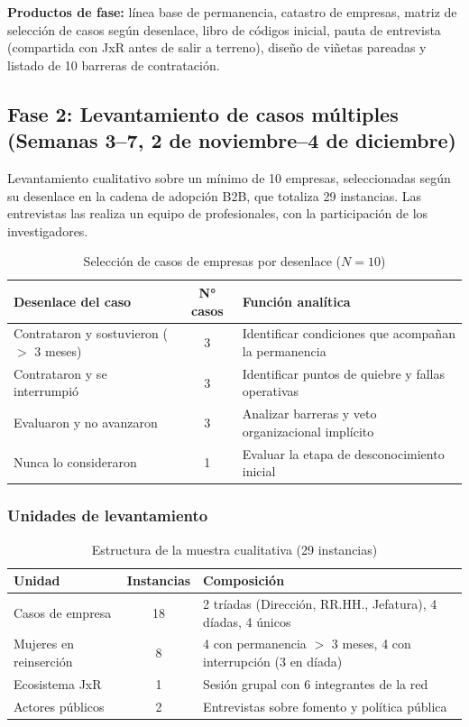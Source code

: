 \textbf{Productos de fase:} línea base de permanencia, catastro de empresas, matriz de selección de casos según desenlace, libro de códigos inicial, pauta de entrevista (compartida con JxR antes de salir a terreno), diseño de viñetas pareadas y listado de 10 barreras de contratación.

\subsection{Fase 2: Levantamiento de casos múltiples (Semanas 3--7, 2 de noviembre--4 de diciembre)}

Levantamiento cualitativo sobre un mínimo de 10 empresas, seleccionadas según su desenlace en la cadena de adopción B2B, que totaliza 29 instancias. Las entrevistas las realiza un equipo de profesionales, con la participación de los investigadores.

\begin{table}[ht]
\centering
\caption{Selección de casos de empresas por desenlace ($N = 10$)}
\label{tab:casos}
\begin{tabular}{p{5.5cm}cp{6.5cm}}
\hline
\textbf{Desenlace del caso} & \textbf{N° casos} & \textbf{Función analítica} \\
\hline
Contrataron y sostuvieron ($>$ 3 meses) & 3 & Identificar condiciones que acompañan la permanencia \\
Contrataron y se interrumpió & 3 & Identificar puntos de quiebre y fallas operativas \\
Evaluaron y no avanzaron & 3 & Analizar barreras y veto organizacional implícito \\
Nunca lo consideraron & 1 & Evaluar la etapa de desconocimiento inicial \\
\hline
\end{tabular}
\end{table}

\subsubsection{Unidades de levantamiento}

\begin{table}[ht]
\centering
\caption{Estructura de la muestra cualitativa (29 instancias)}
\label{tab:muestra}
\begin{tabular}{p{3.8cm}cp{7.5cm}}
\hline
\textbf{Unidad} & \textbf{Instancias} & \textbf{Composición} \\
\hline
Casos de empresa & 18 & 2 tríadas (Dirección, RR.HH., Jefatura), 4 díadas, 4 únicos \\
Mujeres en reinserción & 8 & 4 con permanencia $>$ 3 meses, 4 con interrupción (3 en díada) \\
Ecosistema JxR & 1 & Sesión grupal con 6 integrantes de la red \\
Actores públicos & 2 & Entrevistas sobre fomento y política pública \\
\hline
\end{tabular}
\end{table}

